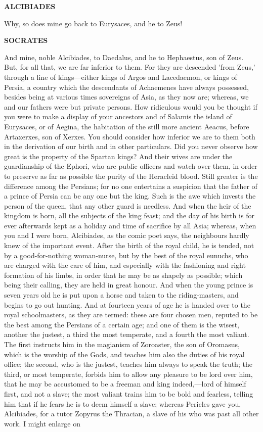 \documentclass[11pt,letter]{article}
\begin{document}
\par \textbf{ALCIBIADES}
\par   Why, so does mine go back to Eurysaces, and he to Zeus!

\par \textbf{SOCRATES}
\par   And mine, noble Alcibiades, to Daedalus, and he to Hephaestus, son of Zeus. But, for all that, we are far inferior to them. For they are descended 'from Zeus,' through a line of kings—either kings of Argos and Lacedaemon, or kings of Persia, a country which the descendants of Achaemenes have always possessed, besides being at various times sovereigns of Asia, as they now are; whereas, we and our fathers were but private persons. How ridiculous would you be thought if you were to make a display of your ancestors and of Salamis the island of Eurysaces, or of Aegina, the habitation of the still more ancient Aeacus, before Artaxerxes, son of Xerxes. You should consider how inferior we are to them both in the derivation of our birth and in other particulars. Did you never observe how great is the property of the Spartan kings? And their wives are under the guardianship of the Ephori, who are public officers and watch over them, in order to preserve as far as possible the purity of the Heracleid blood. Still greater is the difference among the Persians; for no one entertains a suspicion that the father of a prince of Persia can be any one but the king. Such is the awe which invests the person of the queen, that any other guard is needless. And when the heir of the kingdom is born, all the subjects of the king feast; and the day of his birth is for ever afterwards kept as a holiday and time of sacrifice by all Asia; whereas, when you and I were born, Alcibiades, as the comic poet says, the neighbours hardly knew of the important event. After the birth of the royal child, he is tended, not by a good-for-nothing woman-nurse, but by the best of the royal eunuchs, who are charged with the care of him, and especially with the fashioning and right formation of his limbs, in order that he may be as shapely as possible; which being their calling, they are held in great honour. And when the young prince is seven years old he is put upon a horse and taken to the riding-masters, and begins to go out hunting. And at fourteen years of age he is handed over to the royal schoolmasters, as they are termed:  these are four chosen men, reputed to be the best among the Persians of a certain age; and one of them is the wisest, another the justest, a third the most temperate, and a fourth the most valiant. The first instructs him in the magianism of Zoroaster, the son of Oromasus, which is the worship of the Gods, and teaches him also the duties of his royal office; the second, who is the justest, teaches him always to speak the truth; the third, or most temperate, forbids him to allow any pleasure to be lord over him, that he may be accustomed to be a freeman and king indeed,—lord of himself first, and not a slave; the most valiant trains him to be bold and fearless, telling him that if he fears he is to deem himself a slave; whereas Pericles gave you, Alcibiades, for a tutor Zopyrus the Thracian, a slave of his who was past all other work. I might enlarge on 
\end{document}
